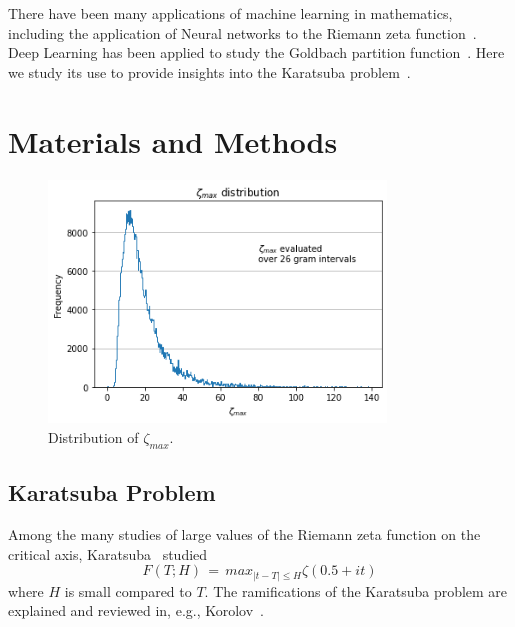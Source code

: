\documentclass[twoside]{article}
\begin{document}
 There have been many applications of machine learning in mathematics, including 
the application of Neural networks to the Riemann zeta function~\cite{osneural}.
Deep Learning has been applied to study the Goldbach partition function~\cite{kim2022}.
Here we study its use to provide insights into  the Karatsuba problem~\cite{K5, Kor1}.


\section{\label{sec2}Materials and Methods}

\begin{figure}
\centering
\includegraphics[width=0.8\textwidth]{1.png}
\caption[]{ 
  Distribution of $\zeta_{max}$. 
  }
\vspace{1mm}
\label{z1}
\end{figure}

\subsection{\label{seckaratsuba}Karatsuba Problem}

Among the many studies of large values of the Riemann zeta function on the critical axis, Karatsuba~\cite{K5} studied 
\begin{equation}
F(T; H)  \, = \, max_{|t-T| \le H} \zeta ( 0.5+it ) 
\label{eqRie}
\end{equation}
where $H$ is small compared to $T$. The ramifications of the Karatsuba problem are explained and
reviewed in, e.g.,  Korolov~\cite{Kor1}.  
\end{document}
